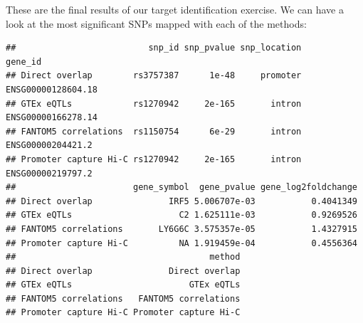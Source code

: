 \documentclass[9pt,a4paper,]{extarticle}
\newenvironment{Shaded}{\begin{snugshade}}{\end{snugshade}}
\newcommand{\KeywordTok}[1]{\textcolor[rgb]{0.13,0.29,0.53}{\textbf{#1}}}
\newcommand{\DataTypeTok}[1]{\textcolor[rgb]{0.13,0.29,0.53}{#1}}
\newcommand{\DecValTok}[1]{\textcolor[rgb]{0.00,0.00,0.81}{#1}}
\newcommand{\StringTok}[1]{\textcolor[rgb]{0.31,0.60,0.02}{#1}}
\newcommand{\OtherTok}[1]{\textcolor[rgb]{0.56,0.35,0.01}{#1}}
\newcommand{\OperatorTok}[1]{\textcolor[rgb]{0.81,0.36,0.00}{\textbf{#1}}}
\newcommand{\NormalTok}[1]{#1}
\theoremstyle{definition}
\theoremstyle{definition}
\theoremstyle{definition}
\theoremstyle{remark}
\begin{document}
\begin{Shaded}
\end{Shaded}

These are the final results of our target identification exercise.
We can have a look at the most significant SNPs mapped with each of the methods:

\begin{Shaded}
\end{Shaded}

\begin{verbatim}
##                          snp_id snp_pvalue snp_location            gene_id
## Direct overlap        rs3757387      1e-48     promoter ENSG00000128604.18
## GTEx eQTLs            rs1270942     2e-165       intron ENSG00000166278.14
## FANTOM5 correlations  rs1150754      6e-29       intron  ENSG00000204421.2
## Promoter capture Hi-C rs1270942     2e-165       intron  ENSG00000219797.2
##                       gene_symbol  gene_pvalue gene_log2foldchange
## Direct overlap               IRF5 5.006707e-03           0.4041349
## GTEx eQTLs                     C2 1.625111e-03           0.9269526
## FANTOM5 correlations       LY6G6C 3.575357e-05           1.4327915
## Promoter capture Hi-C          NA 1.919459e-04           0.4556364
##                                      method
## Direct overlap               Direct overlap
## GTEx eQTLs                       GTEx eQTLs
## FANTOM5 correlations   FANTOM5 correlations
## Promoter capture Hi-C Promoter capture Hi-C
\end{verbatim}
\end{document}
